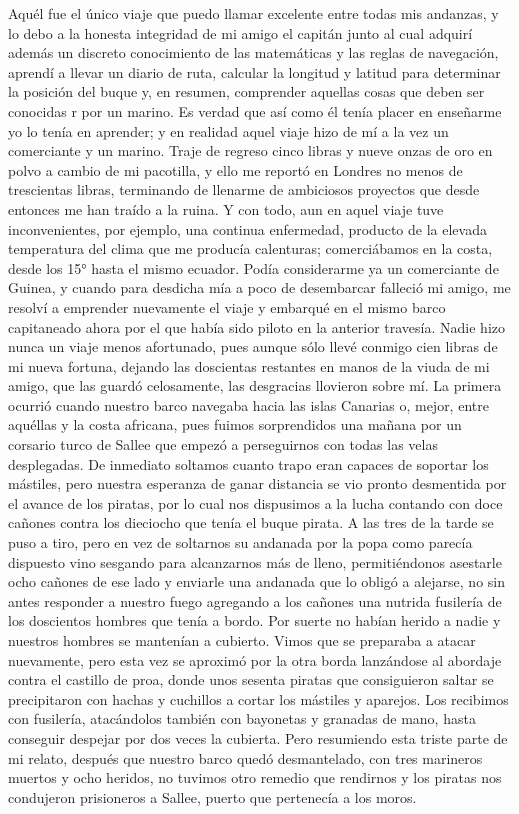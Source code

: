 \documentclass{novela}
\begin{document}
    Aquél fue el único viaje que puedo llamar excelente entre todas mis andanzas, y lo debo a la honesta integridad de mi amigo el capitán junto al cual adquirí además un discreto conocimiento de las matemáticas y las reglas de navegación, aprendí a llevar un diario de ruta, calcular la longitud y latitud para determinar la posición del buque y, en resumen, comprender aquellas cosas que deben ser conocidas r por un marino. Es verdad que así como él tenía placer en enseñarme yo lo tenía en aprender; y en realidad aquel viaje hizo de mí a la vez un comerciante y un marino. Traje de regreso cinco libras y nueve onzas de oro en polvo a cambio de mi pacotilla, y ello me reportó en Londres no menos de trescientas libras, terminando de llenarme de ambiciosos proyectos que desde entonces me han traído a la ruina.
    Y con todo, aun en aquel viaje tuve inconvenientes, por ejemplo, una continua enfermedad, producto de la elevada temperatura del clima que me producía calenturas; comerciábamos en la costa, desde los 15° hasta el mismo ecuador.
    Podía considerarme ya un comerciante de Guinea, y cuando para desdicha mía a poco de desembarcar falleció mi amigo, me resolví a emprender nuevamente el viaje y embarqué en el mismo barco capitaneado ahora por el que había sido piloto en la anterior travesía. Nadie hizo nunca un viaje menos afortunado, pues aunque sólo llevé conmigo cien libras de mi nueva fortuna, dejando las doscientas restantes en manos de la viuda de mi amigo, que las guardó celosamente, las desgracias llovieron sobre mí. La primera ocurrió cuando nuestro barco navegaba hacia las islas Canarias o, mejor, entre aquéllas y la costa africana, pues fuimos sorprendidos una mañana por un corsario turco de Sallee que empezó a perseguirnos con todas las velas desplegadas. De inmediato soltamos cuanto trapo eran capaces de soportar los mástiles, pero nuestra esperanza de ganar distancia se vio pronto desmentida por el avance de los piratas, por lo cual nos dispusimos a la lucha contando con doce cañones contra los dieciocho que tenía el buque pirata. A las tres de la tarde se puso a tiro, pero en vez de soltarnos su andanada por la popa como parecía dispuesto vino sesgando para alcanzarnos más de lleno, permitiéndonos asestarle ocho cañones de ese lado y enviarle una andanada que lo obligó a alejarse, no sin antes responder a nuestro fuego agregando a los cañones una nutrida fusilería de los doscientos hombres que tenía a bordo. Por suerte no habían herido a nadie y nuestros hombres se mantenían a cubierto. Vimos que se preparaba a atacar nuevamente, pero esta vez se aproximó por la otra borda lanzándose al abordaje contra el castillo de proa, donde unos sesenta piratas que consiguieron saltar se precipitaron con hachas y cuchillos a cortar los mástiles y aparejos. Los recibimos con fusilería, atacándolos también con bayonetas y granadas de mano, hasta conseguir despejar por dos veces la cubierta. Pero resumiendo esta triste parte de mi relato, después que nuestro barco quedó desmantelado, con tres marineros muertos y ocho heridos, no tuvimos otro remedio que rendirnos y los piratas nos condujeron prisioneros a Sallee, puerto que pertenecía a los moros.
\end{document}
